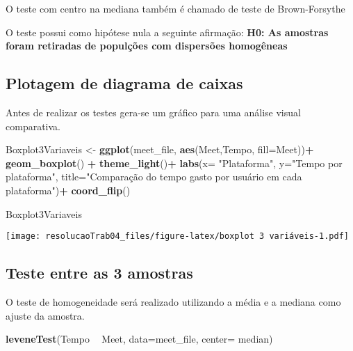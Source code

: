 \documentclass[
]{article}
\newenvironment{Shaded}{\begin{snugshade}}{\end{snugshade}}
\newcommand{\DataTypeTok}[1]{\textcolor[rgb]{0.13,0.29,0.53}{#1}}
\newcommand{\KeywordTok}[1]{\textcolor[rgb]{0.13,0.29,0.53}{\textbf{#1}}}
\newcommand{\NormalTok}[1]{#1}
\newcommand{\OperatorTok}[1]{\textcolor[rgb]{0.81,0.36,0.00}{\textbf{#1}}}
\newcommand{\StringTok}[1]{\textcolor[rgb]{0.31,0.60,0.02}{#1}}
\begin{document}
O teste com centro na mediana também é chamado de teste de
Brown-Forsythe

O teste possui como hipótese nula a seguinte afirmação: \textbf{H0: As
amostras foram retiradas de populções com dispersões homogêneas}

\hypertarget{plotagem-de-diagrama-de-caixas}{%
\subsection{Plotagem de diagrama de
caixas}\label{plotagem-de-diagrama-de-caixas}}

Antes de realizar os testes gera-se um gráfico para uma análise visual
comparativa.

\begin{Shaded}
\begin{Highlighting}[]
\NormalTok{Boxplot3Variaveis <-}\StringTok{ }\KeywordTok{ggplot}\NormalTok{(meet_file, }\KeywordTok{aes}\NormalTok{(Meet,Tempo, }\DataTypeTok{fill=}\NormalTok{Meet))}\OperatorTok{+}
\StringTok{                      }\KeywordTok{geom_boxplot}\NormalTok{() }\OperatorTok{+}\StringTok{ }
\StringTok{                      }\KeywordTok{theme_light}\NormalTok{()}\OperatorTok{+}
\StringTok{                      }\KeywordTok{labs}\NormalTok{(}\DataTypeTok{x=} \StringTok{"Plataforma"}\NormalTok{, }
                           \DataTypeTok{y=}\StringTok{"Tempo por plataforma"}\NormalTok{, }
                           \DataTypeTok{title=}\StringTok{"Comparação do tempo gasto por usuário em cada plataforma"}\NormalTok{)}\OperatorTok{+}
\StringTok{                      }\KeywordTok{coord_flip}\NormalTok{()}

\NormalTok{Boxplot3Variaveis}
\end{Highlighting}
\end{Shaded}

\texttt{[image: resolucaoTrab04\_files/figure-latex/boxplot 3 variáveis-1.pdf]}

\hypertarget{teste-entre-as-3-amostras}{%
\subsection{Teste entre as 3 amostras}\label{teste-entre-as-3-amostras}}

O teste de homogeneidade será realizado utilizando a média e a mediana
como ajuste da amostra.

\begin{Shaded}
\begin{Highlighting}[]
\KeywordTok{leveneTest}\NormalTok{(Tempo }\OperatorTok{~}\StringTok{ }\NormalTok{Meet, }\DataTypeTok{data=}\NormalTok{meet_file, }\DataTypeTok{center=}\NormalTok{ median)}
\end{Highlighting}
\end{Shaded}
\end{document}
